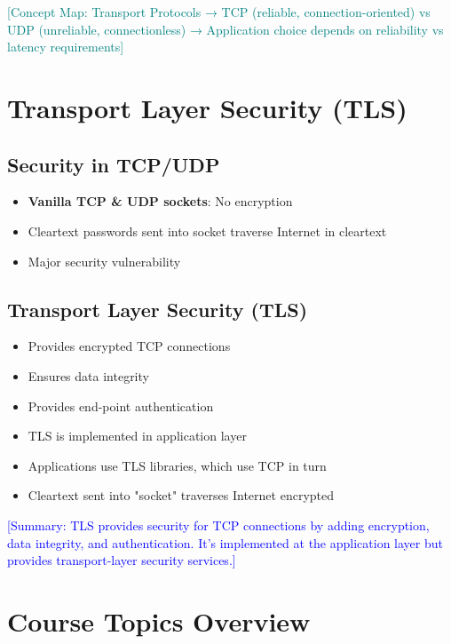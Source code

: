 \documentclass[12pt]{article}
\begin{document}
\textcolor{teal}{[Concept Map: Transport Protocols → TCP (reliable, connection-oriented) vs UDP (unreliable, connectionless) → Application choice depends on reliability vs latency requirements]}

\section{Transport Layer Security (TLS)}

\subsection{Security in TCP/UDP}
\begin{itemize}
    \item \textbf{Vanilla TCP \& UDP sockets}: No encryption
    \item Cleartext passwords sent into socket traverse Internet in cleartext
    \item Major security vulnerability
\end{itemize}

\subsection{Transport Layer Security (TLS)}
\begin{itemize}
    \item Provides encrypted TCP connections
    \item Ensures data integrity
    \item Provides end-point authentication
    \item TLS is implemented in application layer
    \item Applications use TLS libraries, which use TCP in turn
    \item Cleartext sent into "socket" traverses Internet encrypted
\end{itemize}

\textcolor{blue}{[Summary: TLS provides security for TCP connections by adding encryption, data integrity, and authentication. It's implemented at the application layer but provides transport-layer security services.]}

\section{Course Topics Overview}
\end{document}
